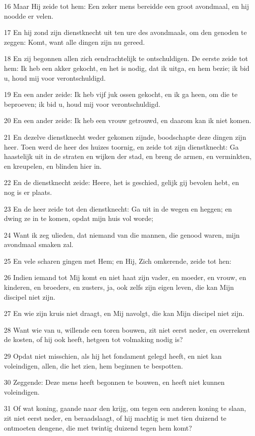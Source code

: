 \par 16 Maar Hij zeide tot hem: Een zeker mens bereidde een groot avondmaal, en hij noodde er velen.
\par 17 En hij zond zijn dienstknecht uit ten ure des avondmaals, om den genoden te zeggen: Komt, want alle dingen zijn nu gereed.
\par 18 En zij begonnen allen zich eendrachtelijk te ontschuldigen. De eerste zeide tot hem: Ik heb een akker gekocht, en het is nodig, dat ik uitga, en hem bezie; ik bid u, houd mij voor verontschuldigd.
\par 19 En een ander zeide: Ik heb vijf juk ossen gekocht, en ik ga heen, om die te beproeven; ik bid u, houd mij voor verontschuldigd.
\par 20 En een ander zeide: Ik heb een vrouw getrouwd, en daarom kan ik niet komen.
\par 21 En dezelve dienstknecht weder gekomen zijnde, boodschapte deze dingen zijn heer. Toen werd de heer des huizes toornig, en zeide tot zijn dienstknecht: Ga haastelijk uit in de straten en wijken der stad, en breng de armen, en verminkten, en kreupelen, en blinden hier in.
\par 22 En de dienstknecht zeide: Heere, het is geschied, gelijk gij bevolen hebt, en nog is er plaats.
\par 23 En de heer zeide tot den dienstknecht: Ga uit in de wegen en heggen; en dwing ze in te komen, opdat mijn huis vol worde;
\par 24 Want ik zeg ulieden, dat niemand van die mannen, die genood waren, mijn avondmaal smaken zal.
\par 25 En vele scharen gingen met Hem; en Hij, Zich omkerende, zeide tot hen:
\par 26 Indien iemand tot Mij komt en niet haat zijn vader, en moeder, en vrouw, en kinderen, en broeders, en zusters, ja, ook zelfs zijn eigen leven, die kan Mijn discipel niet zijn.
\par 27 En wie zijn kruis niet draagt, en Mij navolgt, die kan Mijn discipel niet zijn.
\par 28 Want wie van u, willende een toren bouwen, zit niet eerst neder, en overrekent de kosten, of hij ook heeft, hetgeen tot volmaking nodig is?
\par 29 Opdat niet misschien, als hij het fondament gelegd heeft, en niet kan voleindigen, allen, die het zien, hem beginnen te bespotten.
\par 30 Zeggende: Deze mens heeft begonnen te bouwen, en heeft niet kunnen voleindigen.
\par 31 Of wat koning, gaande naar den krijg, om tegen een anderen koning te slaan, zit niet eerst neder, en beraadslaagt, of hij machtig is met tien duizend te ontmoeten dengene, die met twintig duizend tegen hem komt?
